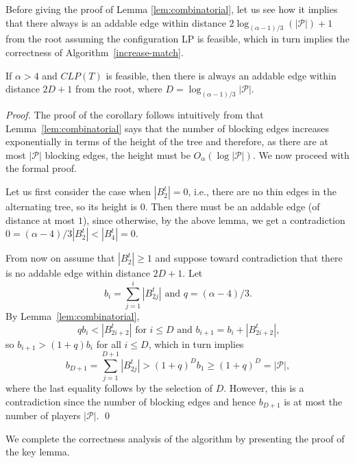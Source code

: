 \documentclass{llncs}
\newcommand{\players}{\ensuremath{\mathcal{P}}\xspace}
\begin{document}
Before giving the proof of Lemma \ref{lem:combinatorial}, let us see how it
implies that there always is an addable edge within distance $2
\log_{(\alpha-1)/3}(|\players|)+1$ from the root assuming the configuration LP
is feasible, which in turn implies the correctness of
Algorithm~\ref{increase-match}.

\begin{corollary}
  \label{cor:height}
  If $\alpha>4$ and $CLP(T)$ is feasible, then there is always an addable edge
  within distance $2D+1$ from the root, where $D =
  \log_{(\alpha-1)/3}|\players|$.
\end{corollary}
\begin{proof}
The proof of the corollary follows intuitively from that Lemma~\ref{lem:combinatorial} says that
the number of blocking edges increases  exponentially in terms of the height of the tree and
therefore, as there are at most $|\players|$ blocking edges, the height must be $O_\alpha(
\log|\players|)$. We now proceed with the formal proof.

Let us first consider the case when $|B_2^t|=0$, i.e., there are no
thin edges in the alternating tree, so its height is $0$. Then there must be an
addable edge (of distance at most $1$), since otherwise, by the above lemma, we
get a contradiction $0=(\alpha-4)/3|B_2^t|<|B_4^t|=0$.

From now on assume that $|B_2^t|\geq 1$ and suppose toward contradiction that
there is no addable edge within distance $2D+1$. Let
\begin{equation*}
  \text{$b_i=\sum_{j=1}^i |B_{2j}^t|$ and $q=(\alpha-4)/3$.}
\end{equation*}
By Lemma~\ref{lem:combinatorial},
\begin{equation*}
  \text{$q b_i<|B^t_{2i+2}|$ for $i\leq D$ and $b_{i+1}=b_i+|B^t_{2i+2}|$,}
\end{equation*}
so $b_{i+1}>(1+q)b_i$ for all $i\leq D$, which in turn implies
\begin{equation*}
b_{D+1} = \sum_{j = 1}^{D+1} |B^t_{2j}| >(1+q)^{D}b_1  \geq (1+q)^D = |\players|,
\end{equation*}
where the last equality follows by the selection of $D$.  However, this is a
contradiction since the number of blocking edges and hence $b_{D+1}$ is at
most the number of players $|\players|$.
\qed

\end{proof}
We complete the correctness analysis of the algorithm by presenting the  proof of the key lemma.
\end{document}
